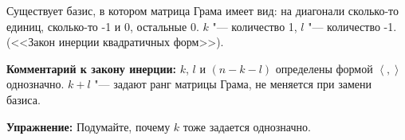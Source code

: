 \begin{conseq}
	Существует базис, в котором матрица Грама имеет вид: на диагонали сколько-то единиц, сколько-то -1 и 0, остальные 0.
	$k$ "--- количество 1, $l$ "--- количество -1.
	(<<Закон инерции квадратичных форм>>).
\end{conseq}

\textbf{Комментарий к закону инерции:}
$k$, $l$ и $(n - k - l)$ определены формой $\left<,\right>$ однозначно.
$k + l$ "--- задают ранг матрицы Грама, не меняется при замени базиса.

\textbf{Упражнение:}
Подумайте, почему $k$ тоже задается однозначно.
